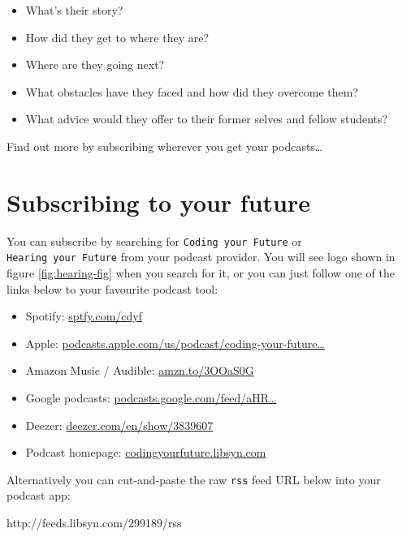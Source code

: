 \documentclass[
]{book}
\newenvironment{Shaded}{\begin{snugshade}}{\end{snugshade}}
\newcommand{\NormalTok}[1]{#1}
\providecommand{\tightlist}{%
  \setlength{\itemsep}{0pt}\setlength{\parskip}{0pt}}
\begin{document}
\begin{itemize}
\tightlist
\item
  What's their story?\\
\item
  How did they get to where they are?
\item
  Where are they going next?
\item
  What obstacles have they faced and how did they overcome them?
\item
  What advice would they offer to their former selves and fellow students?
\end{itemize}

Find out more by subscribing wherever you get your podcasts\ldots{}

\hypertarget{subscribing}{%
\section{Subscribing to your future}\label{subscribing}}

You can subscribe by searching for \texttt{Coding\ your\ Future} or \texttt{Hearing\ your\ Future} from your podcast provider. You will see logo shown in figure \ref{fig:hearing-fig} when you search for it, or you can just follow one of the links below to your favourite podcast tool:

\begin{itemize}
\tightlist
\item
  Spotify: \href{https://sptfy.com/cdyf}{sptfy.com/cdyf}
\item
  Apple: \href{https://podcasts.apple.com/us/podcast/coding-your-future/id1632252996}{podcasts.apple.com/us/podcast/coding-your-future\ldots{}}
\item
  Amazon Music / Audible: \href{https://amzn.to/3OOaS0G}{amzn.to/3OOaS0G}
\item
  Google podcasts: \href{https://podcasts.google.com/feed/aHR0cHM6Ly9mZWVkcy5saWJzeW4uY29tLzI5OTE4OS9yc3M=}{podcasts.google.com/feed/aHR\ldots{}}
\item
  Deezer: \href{https://www.deezer.com/en/show/3839607}{deezer.com/en/show/3839607}
\item
  Podcast homepage: \href{https://codingyourfuture.libsyn.com/}{codingyourfuture.libsyn.com}
\end{itemize}

Alternatively you can cut-and-paste the raw \texttt{rss} feed URL below into your podcast app:

\begin{Shaded}
\begin{Highlighting}[]
\NormalTok{http://feeds.libsyn.com/299189/rss}
\end{Highlighting}
\end{Shaded}
\end{document}
